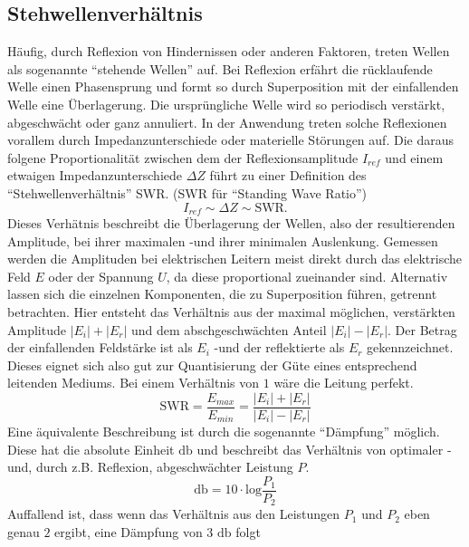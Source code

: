 \subsection{Stehwellenverhältnis} 
Häufig, durch Reflexion von Hindernissen oder anderen Faktoren, treten Wellen als sogenannte \enquote{stehende Wellen} auf. %
Bei Reflexion erfährt die rücklaufende Welle einen Phasensprung und formt so durch Superposition mit der einfallenden Welle eine Überlagerung. Die ursprüngliche Welle wird so periodisch verstärkt, abgeschwächt oder ganz annuliert. 
In der Anwendung treten solche Reflexionen vorallem durch Impedanzunterschiede oder materielle Störungen auf. Die daraus folgene Proportionalität zwischen dem der Reflexionsamplitude $I_{ref}$ und einem etwaigen Impedanzunterschiede $\Delta Z$
führt zu einer Definition des \enquote{Stehwellenverhältnis} SWR. (SWR für \enquote{Standing Wave Ratio}) 
\begin{equation*}
    I_{ref} \sim \Delta Z \sim \text{SWR}.
\end{equation*}
Dieses Verhätnis beschreibt die Überlagerung der Wellen, also der resultierenden Amplitude, bei ihrer maximalen -und ihrer minimalen Auslenkung. 
Gemessen werden die Amplituden bei elektrischen Leitern meist direkt durch das elektrische Feld $E$ oder der Spannung $U$, da diese proportional zueinander sind.
Alternativ lassen sich die einzelnen Komponenten, die zu Superposition führen, getrennt betrachten. Hier entsteht das Verhältnis aus der maximal möglichen, verstärkten Amplitude $|E_i| + |E_r|$ und dem abschgeschwächten Anteil $|E_i| - |E_r|$.
Der Betrag der einfallenden Feldstärke ist als $E_i$ -und der reflektierte als $E_r$ gekennzeichnet. Dieses eignet sich also gut zur Quantisierung der Güte eines entsprechend leitenden Mediums. Bei einem Verhältnis von $1$ wäre die Leitung perfekt.
\begin{equation*}
    \text{SWR} = \frac{E_{max}}{E_{min}} =  \frac{|E_i| + |E_r|}{|E_i| - |E_r|}
\end{equation*}
Eine äquivalente Beschreibung ist durch die sogenannte \enquote{Dämpfung} möglich. Diese hat die absolute Einheit $\si{\decibel}$ und beschreibt das Verhältnis von optimaler -und, durch z.B. Reflexion, abgeschwächter Leistung $P$. 
\begin{equation*}
    \si{\decibel} = 10 \cdot \text{log} \frac{P_1}{P_2}
\end{equation*}
Auffallend ist, dass wenn das Verhältnis aus den Leistungen $P_1$ und $P_2$ eben genau $2$ ergibt, eine Dämpfung von 3 $\si{\decibel}$ folgt
